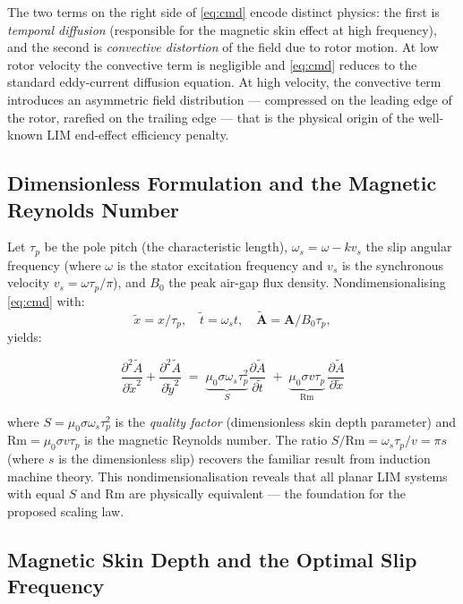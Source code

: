 \documentclass[12pt,letterpaper]{article}
\begin{document}
The two terms on the right side of \cref{eq:cmd} encode distinct physics:
the first is \emph{temporal diffusion} (responsible for the magnetic skin effect at
high frequency), and the second is \emph{convective distortion} of the field due to
rotor motion. At low rotor velocity the convective term is negligible and
\cref{eq:cmd} reduces to the standard eddy-current diffusion equation. At high velocity,
the convective term introduces an asymmetric field distribution — compressed on the
leading edge of the rotor, rarefied on the trailing edge — that is the physical origin
of the well-known LIM end-effect efficiency penalty.

\subsection{Dimensionless Formulation and the Magnetic Reynolds Number}

Let $\tau_p$ be the pole pitch (the characteristic length), $\omega_s = \omega - k v_s$
the slip angular frequency (where $\omega$ is the stator excitation frequency and $v_s$
is the synchronous velocity $v_s = \omega \tau_p / \pi$), and $B_0$ the peak air-gap
flux density. Nondimensionalising \cref{eq:cmd} with:
\[
  \tilde{x} = x/\tau_p, \quad
  \tilde{t} = \omega_s t, \quad
  \tilde{\mathbf{A}} = \mathbf{A}/B_0\tau_p,
\]
yields:

\begin{equation}
  \frac{\partial^2 \tilde{A}}{\partial \tilde{x}^2}
  + \frac{\partial^2 \tilde{A}}{\partial \tilde{y}^2}
  \;=\; \underbrace{\mu_0\sigma\omega_s\tau_p^2}_{\displaystyle S}
  \frac{\partial \tilde{A}}{\partial \tilde{t}}
  \;+\; \underbrace{\mu_0\sigma v\tau_p}_{\displaystyle \mathrm{Rm}}\,
  \frac{\partial \tilde{A}}{\partial \tilde{x}}
  \label{eq:cmd_nd}
\end{equation}

where $S = \mu_0\sigma\omega_s\tau_p^2$ is the \emph{quality factor} (dimensionless skin
depth parameter) and $\mathrm{Rm} = \mu_0\sigma v\tau_p$ is the magnetic Reynolds number.
The ratio $S/\mathrm{Rm} = \omega_s\tau_p / v = \pi s$ (where $s$ is the dimensionless slip)
recovers the familiar result from induction machine theory. This nondimensionalisation
reveals that all planar LIM systems with equal $S$ and $\mathrm{Rm}$ are physically
equivalent — the foundation for the proposed scaling law.

\subsection{Magnetic Skin Depth and the Optimal Slip Frequency}
\end{document}

